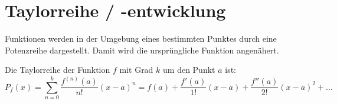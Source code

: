 \section{Taylorreihe / -entwicklung}
Funktionen werden in der Umgebung eines bestimmten Punktes durch eine
Potenzreihe dargestellt. Damit wird die ursprüngliche Funktion angenähert.

Die Taylorreihe der Funktion $f$ mit Grad $k$ um den Punkt $a$ ist:
{\small
\[
P_f(x) = \sum_{n = 0}^k \frac{f^{(n)}(a)}{n!}(x - a)^n = f(a) +
\frac{f'(a)}{1!}(x-a) + \frac{f''(a)}{2!}(x-a)^2 + \ldots
\]
}